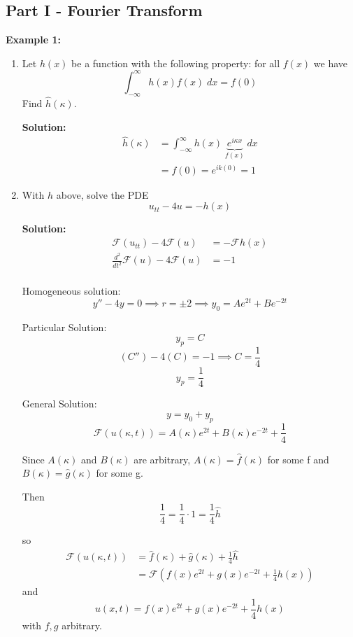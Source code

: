 \documentclass[12pt]{article}
\renewcommand{\hat}[1]{\widehat{#1}}
\newcommand{\F}{\mathcal{F}}
\begin{document}
\subsection*{Part I - Fourier Transform}
\textbf{Example 1:}
\begin{enumerate}
    \item Let $h(x)$ be a function with the following property: for all $f(x)$ we have 
    \[\int_{-\infty}^\infty h(x) f(x)\; dx = f(0)\] 
    Find $\hat{h}(\kappa)$.

    \textbf{Solution:}
    \begin{align*}
        \hat h(\kappa) &= \int_{-\infty}^{\infty} h(x) \; \underbrace{e^{i\kappa x}}_{f(x)} \; dx\\
        &= f(0) = e^{ik(0)} = \boxed{1}
    \end{align*}

    \item With $h$ above, solve the PDE 
    \[u_{tt} - 4u = -h(x)\]

    \textbf{Solution:}
    \begin{align*}
        \F(u_{tt}) - 4\F(u) &= -\F{h(x)}\\
        \frac{d^2}{dt^2}\F(u) - 4\F(u) &= -1\\
    \end{align*}

    Homogeneous solution:
    \[y'' - 4y = 0 \implies r = \pm 2 \implies y_0 = Ae^{2t} + Be^{-2t}\]

    Particular Solution:
    \[y_p = C\]
    \[(C'') - 4(C) = -1 \implies C = \frac{1}{4}\]
    \[y_p = \frac{1}{4}\]

    General Solution:
    \[y = y_0 + y_p\]
    \[\F(u(\kappa, t)) = A(\kappa)e^{2t} + B(\kappa)e^{-2t} + \frac{1}{4} \]

    Since $A(\kappa)$ and $B(\kappa)$ are arbitrary, $A(\kappa) = \hat f (\kappa)$ for some f and $B(\kappa) = \hat g (\kappa)$ for some g. 

    Then
    \[\frac{1}{4} = \frac{1}{4} \cdot 1 = \frac{1}{4}\hat{h}\]

    so 
    \begin{align*}
        \F(u(\kappa, t)) &= \hat f(\kappa) + \hat g (\kappa) + \frac{1}{4}\hat{h}\\
        &= \F(f(x)e^{2t} + g(x)e^{-2t} + \frac{1}{4}h(x))
    \end{align*}
    and 
    \[\boxed{u(x, t) = f(x)e^{2t} + g(x)e^{-2t} + \frac{1}{4}h(x)}\]
    with $f, g$ arbitrary. 
\end{enumerate}
\end{document}
